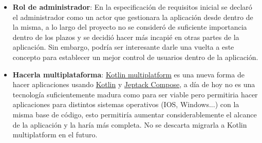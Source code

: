 \begin{itemize}
    \item \textbf{Rol de administrador}: En la especificación de requisitos inicial se declaró el administrador como un actor que gestionara la aplicación desde dentro de la misma, a lo largo del proyecto no se consideró de suficiente importancia dentro de los plazos y se decidió hacer más incapié en otras partes de la aplicación. Sin embargo, podría ser interesante darle una vuelta a este concepto para establecer un mejor control de usuarios dentro de la aplicación.
    \item \textbf{Hacerla multiplataforma}: \href{https://kotlinlang.org/docs/multiplatform.html}{Kotlin multiplatform} es una nueva forma de hacer aplicaciones usando \hyperlink{subsec:kotlin}{Kotlin} y \hyperlink{subsec:compose}{Jeptack Compose}, a día de hoy no es una tecnología suficientemente madura como para ser viable pero permitiria hacer aplicaciones para distintos sistemas operativos (IOS, Windows...) con la misma base de código, esto permitiría aumentar considerablemente el alcance de la aplicación y la haría más completa. No se descarta migrarla a Kotlin multiplatform en el futuro.
\end{itemize}


